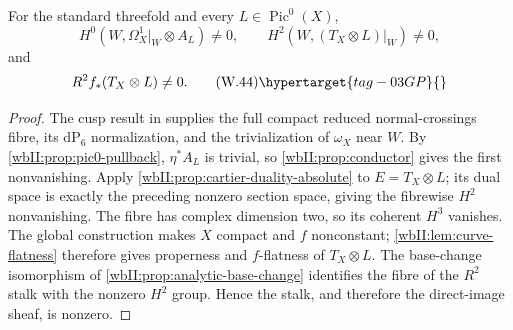 \begin{corollary}
\hypertarget{tag-03DS}{}\label{wbII:cor:candidate-pic0-route}

For the standard threefold and every
$L\in\operatorname{Pic}^0(X)$,
\[
 H^0(W,\Omega_X^1|_W\otimes A_L)\ne0,
 \qquad
 H^2(W,(T_X\otimes L)|_W)\ne0,
\]
and
\[
 R^2f_*(T_X\otimes L)\ne0.
\tag{W.44}\hypertarget{tag-03GP}{}\label{wbII:eq:W:5.17f}
\]
\end{corollary}



\begin{proof}
The cusp result in  supplies the full compact
reduced normal-crossings fibre, its $\mathrm{dP}_6$ normalization, and the
trivialization of $\omega_X$ near $W$.  By
\cref{wbII:prop:pic0-pullback}, $\eta^*A_L$ is trivial, so
\cref{wbII:prop:conductor} gives the first nonvanishing.  Apply
\cref{wbII:prop:cartier-duality-absolute} to $E=T_X\otimes L$; its dual space is
exactly the preceding nonzero section space, giving the fibrewise $H^2$
nonvanishing.  The fibre has complex dimension two, so its coherent
$H^3$ vanishes.  The global construction makes $X$ compact and $f$
nonconstant; \cref{wbII:lem:curve-flatness} therefore gives properness and
$f$-flatness of $T_X\otimes L$.  The base-change isomorphism of
\cref{wbII:prop:analytic-base-change} identifies the fibre of the $R^2$
stalk with the nonzero $H^2$ group.  Hence the stalk, and therefore the
direct-image sheaf, is nonzero.

\end{proof}